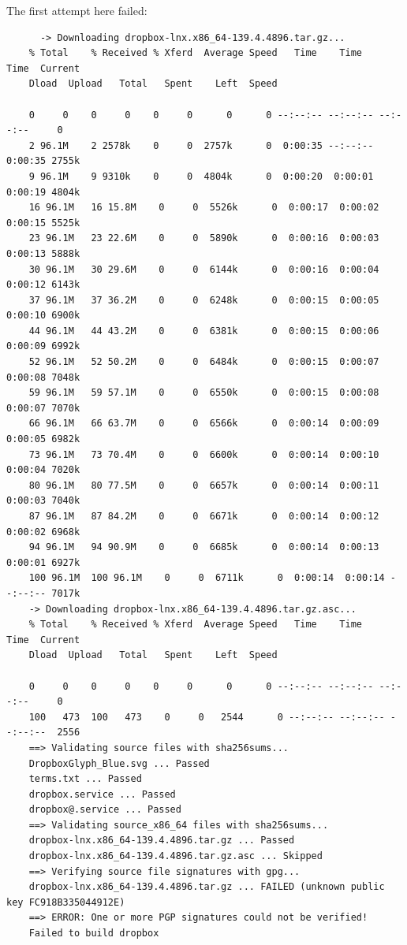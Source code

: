 \documentclass[]{scrartcl}
\begin{document}
The first attempt here failed:
\begin{small}
\begin{verbatim}
	  -> Downloading dropbox-lnx.x86_64-139.4.4896.tar.gz...
	% Total    % Received % Xferd  Average Speed   Time    Time     Time  Current
	Dload  Upload   Total   Spent    Left  Speed
	
	0     0    0     0    0     0      0      0 --:--:-- --:--:-- --:--:--     0
	2 96.1M    2 2578k    0     0  2757k      0  0:00:35 --:--:--  0:00:35 2755k
	9 96.1M    9 9310k    0     0  4804k      0  0:00:20  0:00:01  0:00:19 4804k
	16 96.1M   16 15.8M    0     0  5526k      0  0:00:17  0:00:02  0:00:15 5525k
	23 96.1M   23 22.6M    0     0  5890k      0  0:00:16  0:00:03  0:00:13 5888k
	30 96.1M   30 29.6M    0     0  6144k      0  0:00:16  0:00:04  0:00:12 6143k
	37 96.1M   37 36.2M    0     0  6248k      0  0:00:15  0:00:05  0:00:10 6900k
	44 96.1M   44 43.2M    0     0  6381k      0  0:00:15  0:00:06  0:00:09 6992k
	52 96.1M   52 50.2M    0     0  6484k      0  0:00:15  0:00:07  0:00:08 7048k
	59 96.1M   59 57.1M    0     0  6550k      0  0:00:15  0:00:08  0:00:07 7070k
	66 96.1M   66 63.7M    0     0  6566k      0  0:00:14  0:00:09  0:00:05 6982k
	73 96.1M   73 70.4M    0     0  6600k      0  0:00:14  0:00:10  0:00:04 7020k
	80 96.1M   80 77.5M    0     0  6657k      0  0:00:14  0:00:11  0:00:03 7040k
	87 96.1M   87 84.2M    0     0  6671k      0  0:00:14  0:00:12  0:00:02 6968k
	94 96.1M   94 90.9M    0     0  6685k      0  0:00:14  0:00:13  0:00:01 6927k
	100 96.1M  100 96.1M    0     0  6711k      0  0:00:14  0:00:14 --:--:-- 7017k
	-> Downloading dropbox-lnx.x86_64-139.4.4896.tar.gz.asc...
	% Total    % Received % Xferd  Average Speed   Time    Time     Time  Current
	Dload  Upload   Total   Spent    Left  Speed
	
	0     0    0     0    0     0      0      0 --:--:-- --:--:-- --:--:--     0
	100   473  100   473    0     0   2544      0 --:--:-- --:--:-- --:--:--  2556
	==> Validating source files with sha256sums...
	DropboxGlyph_Blue.svg ... Passed
	terms.txt ... Passed
	dropbox.service ... Passed
	dropbox@.service ... Passed
	==> Validating source_x86_64 files with sha256sums...
	dropbox-lnx.x86_64-139.4.4896.tar.gz ... Passed
	dropbox-lnx.x86_64-139.4.4896.tar.gz.asc ... Skipped
	==> Verifying source file signatures with gpg...
	dropbox-lnx.x86_64-139.4.4896.tar.gz ... FAILED (unknown public key FC918B335044912E)
	==> ERROR: One or more PGP signatures could not be verified!
	Failed to build dropbox
\end{verbatim}
\end{small}
\end{document}
